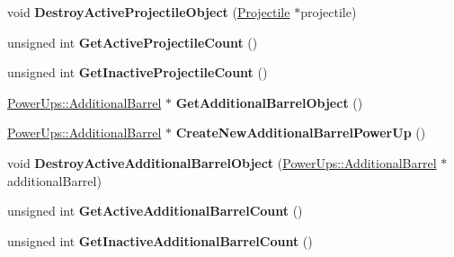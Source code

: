 \begin{DoxyCompactItemize}
\item 
\hypertarget{class_arena_1_1_object_pool_ac93918883a7b94f94960f9c39bc3c243}{void {\bfseries Destroy\+Active\+Projectile\+Object} (\hyperlink{class_arena_1_1_projectile}{Projectile} $\ast$projectile)}\label{class_arena_1_1_object_pool_ac93918883a7b94f94960f9c39bc3c243}

\item 
\hypertarget{class_arena_1_1_object_pool_a57c198c10b856a9c2a2be798c84c1622}{unsigned int {\bfseries Get\+Active\+Projectile\+Count} ()}\label{class_arena_1_1_object_pool_a57c198c10b856a9c2a2be798c84c1622}

\item 
\hypertarget{class_arena_1_1_object_pool_aa8d5b17e4bb15c012a57e0bae13c010c}{unsigned int {\bfseries Get\+Inactive\+Projectile\+Count} ()}\label{class_arena_1_1_object_pool_aa8d5b17e4bb15c012a57e0bae13c010c}

\item 
\hypertarget{class_arena_1_1_object_pool_a85e12cbc408a2bd0756983858190b1d6}{\hyperlink{class_arena_1_1_power_ups_1_1_additional_barrel}{Power\+Ups\+::\+Additional\+Barrel} $\ast$ {\bfseries Get\+Additional\+Barrel\+Object} ()}\label{class_arena_1_1_object_pool_a85e12cbc408a2bd0756983858190b1d6}

\item 
\hypertarget{class_arena_1_1_object_pool_a885490174c6e54139fce91c97e969d18}{\hyperlink{class_arena_1_1_power_ups_1_1_additional_barrel}{Power\+Ups\+::\+Additional\+Barrel} $\ast$ {\bfseries Create\+New\+Additional\+Barrel\+Power\+Up} ()}\label{class_arena_1_1_object_pool_a885490174c6e54139fce91c97e969d18}

\item 
\hypertarget{class_arena_1_1_object_pool_a29953b8730216d72e26a3ab7f2a64c58}{void {\bfseries Destroy\+Active\+Additional\+Barrel\+Object} (\hyperlink{class_arena_1_1_power_ups_1_1_additional_barrel}{Power\+Ups\+::\+Additional\+Barrel} $\ast$additional\+Barrel)}\label{class_arena_1_1_object_pool_a29953b8730216d72e26a3ab7f2a64c58}

\item 
\hypertarget{class_arena_1_1_object_pool_af1413e23d4088b1b808f29015b423aa8}{unsigned int {\bfseries Get\+Active\+Additional\+Barrel\+Count} ()}\label{class_arena_1_1_object_pool_af1413e23d4088b1b808f29015b423aa8}

\item 
\hypertarget{class_arena_1_1_object_pool_a730bf993765648fed72f139cb504555a}{unsigned int {\bfseries Get\+Inactive\+Additional\+Barrel\+Count} ()}\label{class_arena_1_1_object_pool_a730bf993765648fed72f139cb504555a}


\end{DoxyCompactItemize}
